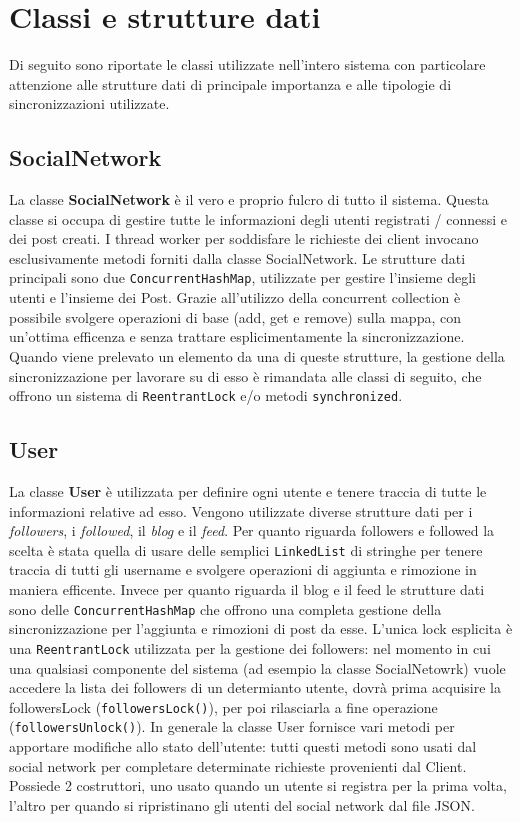 \documentclass[11pt, a4paper, oneside]{article}
\begin{document}
\section{Classi e strutture dati}
Di seguito sono riportate le classi utilizzate nell'intero sistema con particolare attenzione alle strutture dati di principale importanza e alle tipologie di 
sincronizzazioni utilizzate.
\subsection{SocialNetwork}
La classe \textbf{SocialNetwork} è il vero e proprio fulcro di tutto il sistema. Questa classe si occupa di gestire tutte le informazioni degli utenti registrati / connessi e
dei post creati. I thread worker per soddisfare le richieste dei client invocano esclusivamente metodi forniti dalla classe SocialNetwork.
Le strutture dati principali sono due \texttt{ConcurrentHashMap}, utilizzate per gestire l'insieme degli utenti e l'insieme dei Post. Grazie all'utilizzo della concurrent collection
è possibile svolgere operazioni di base (add, get e remove) sulla mappa, con un'ottima efficenza e senza trattare esplicimentamente la sincronizzazione. 
Quando viene prelevato un elemento da una di queste strutture, la gestione della sincronizzazione per lavorare su di esso è rimandata alle classi di seguito, che 
offrono un sistema di \texttt{ReentrantLock} e/o metodi \texttt{synchronized}. 
\subsection{User}
La classe \textbf{User} è utilizzata per definire ogni utente e tenere traccia di tutte le informazioni relative ad esso. Vengono utilizzate diverse strutture dati
per i \textit{followers}, i \textit{followed}, il \textit{blog} e il \textit{feed}. Per quanto riguarda followers e followed la scelta è stata quella di usare delle semplici \texttt{LinkedList} di stringhe
per tenere traccia di tutti gli username e svolgere operazioni di aggiunta e rimozione in maniera efficente. Invece per quanto riguarda il blog e il feed le strutture dati sono delle \texttt{ConcurrentHashMap}
che offrono una completa gestione della sincronizzazione per l'aggiunta e rimozioni di post da esse. L'unica lock esplicita è una \texttt{ReentrantLock} utilizzata 
per la gestione dei followers: nel momento in cui una qualsiasi componente del sistema (ad esempio la classe SocialNetowrk) vuole accedere la lista dei followers di un determianto utente, dovrà prima 
acquisire la followersLock (\texttt{followersLock()}), per poi rilasciarla a fine operazione (\texttt{followersUnlock()}).
In generale la classe User fornisce vari metodi per apportare modifiche allo stato dell'utente: tutti questi metodi sono usati dal social network per completare determinate
richieste provenienti dal Client. Possiede 2 costruttori, uno usato quando un utente si registra per la prima volta, l'altro per quando si ripristinano gli utenti 
del social network dal file JSON.
\end{document}
